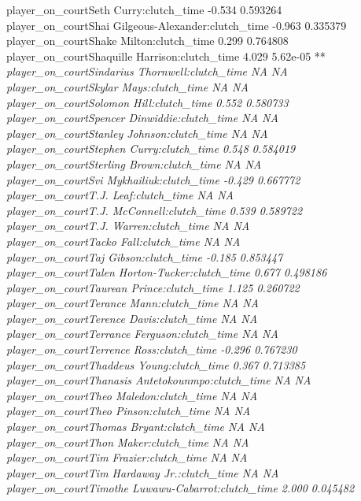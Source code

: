 \documentclass[
  landscape]{article}
\begin{document}
player\_on\_courtSeth Curry:clutch\_time -0.534 0.593264\\
player\_on\_courtShai Gilgeous-Alexander:clutch\_time -0.963 0.335379\\
player\_on\_courtShake Milton:clutch\_time 0.299 0.764808\\
player\_on\_courtShaquille Harrison:clutch\_time 4.029 5.62e-05 **\emph{
player\_on\_courtSindarius Thornwell:clutch\_time NA NA\\
player\_on\_courtSkylar Mays:clutch\_time NA NA\\
player\_on\_courtSolomon Hill:clutch\_time 0.552 0.580733\\
player\_on\_courtSpencer Dinwiddie:clutch\_time NA NA\\
player\_on\_courtStanley Johnson:clutch\_time NA NA\\
player\_on\_courtStephen Curry:clutch\_time 0.548 0.584019\\
player\_on\_courtSterling Brown:clutch\_time NA NA\\
player\_on\_courtSvi Mykhailiuk:clutch\_time -0.429 0.667772\\
player\_on\_courtT.J. Leaf:clutch\_time NA NA\\
player\_on\_courtT.J. McConnell:clutch\_time 0.539 0.589722\\
player\_on\_courtT.J. Warren:clutch\_time NA NA\\
player\_on\_courtTacko Fall:clutch\_time NA NA\\
player\_on\_courtTaj Gibson:clutch\_time -0.185 0.853447\\
player\_on\_courtTalen Horton-Tucker:clutch\_time 0.677 0.498186\\
player\_on\_courtTaurean Prince:clutch\_time 1.125 0.260722\\
player\_on\_courtTerance Mann:clutch\_time NA NA\\
player\_on\_courtTerence Davis:clutch\_time NA NA\\
player\_on\_courtTerrance Ferguson:clutch\_time NA NA\\
player\_on\_courtTerrence Ross:clutch\_time -0.296 0.767230\\
player\_on\_courtThaddeus Young:clutch\_time 0.367 0.713385\\
player\_on\_courtThanasis Antetokounmpo:clutch\_time NA NA\\
player\_on\_courtTheo Maledon:clutch\_time NA NA\\
player\_on\_courtTheo Pinson:clutch\_time NA NA\\
player\_on\_courtThomas Bryant:clutch\_time NA NA\\
player\_on\_courtThon Maker:clutch\_time NA NA\\
player\_on\_courtTim Frazier:clutch\_time NA NA\\
player\_on\_courtTim Hardaway Jr.:clutch\_time NA NA\\
player\_on\_courtTimothe Luwawu-Cabarrot:clutch\_time 2.000 0.045482 }\\
\end{document}
